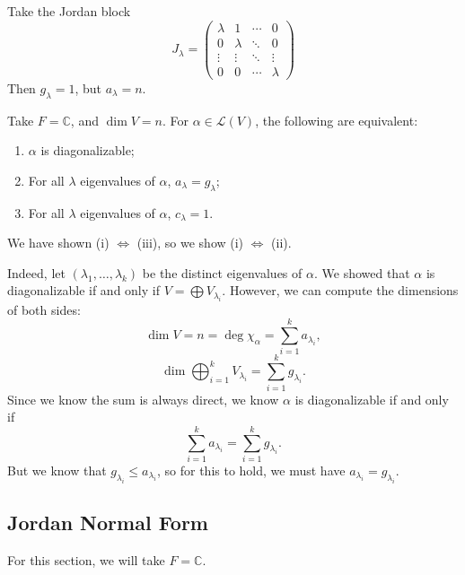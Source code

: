 \documentclass[12pt]{article}
\begin{document}
\begin{exbox}
	Take the Jordan block
	\[
	J_{\lambda} =
	\begin{pmatrix}
		 \lambda & 1 & \cdots & 0 \\
		 0 & \lambda & \ddots & 0 \\
		 \vdots & \vdots & \ddots & \vdots \\
		 0 & 0 & \cdots & \lambda
	\end{pmatrix}
	\]
	Then $g_{\lambda} = 1$, but $a_{\lambda} = n$.
\end{exbox}

\begin{lemma}
	Take $F = \mathbb{C}$, and $\dim V = n$. For $\alpha \in \mathcal{L}(V)$, the following are equivalent:
	\begin{enumerate}[\normalfont(i)]
		\item $\alpha$ is diagonalizable;
		\item For all $\lambda$ eigenvalues of $\alpha$, $a_{\lambda} = g_{\lambda}$;
		\item For all $\lambda$ eigenvalues of $\alpha$, $c_{\lambda} = 1$.
	\end{enumerate}
\end{lemma}

\begin{proofbox}
	We have shown (i) $\iff$ (iii), so we show (i) $\iff$ (ii).

		Indeed, let $(\lambda_1, \ldots, \lambda_k)$ be the distinct eigenvalues of $\alpha$. We showed that $\alpha$ is diagonalizable if and only if $V = \bigoplus V_{\lambda_i}$. However, we can compute the dimensions of both sides:
		\[
		\dim V = n = \deg \chi_{\alpha} = \sum_{i = 1}^{k} a_{\lambda_i}
		,\]
		\[
		\dim \bigoplus_{i = 1}^{k} V_{\lambda_i} = \sum_{i = 1}^{k} g_{\lambda_i}
		.\]
		Since we know the sum is always direct, we know $\alpha$ is diagonalizable if and only if
		\[
		\sum_{i = 1}^{k}a_{\lambda_i} = \sum_{i = 1}^{k} g_{\lambda_i}
		.\]
		But we know that $g_{\lambda_i} \leq a_{\lambda_i}$, so for this to hold, we must have $a_{\lambda_i} = g_{\lambda_i}$.
\end{proofbox}

\subsection{Jordan Normal Form}%
\label{sub:jordan_normal_form}

For this section, we will take $F = \mathbb{C}$.
\end{document}
